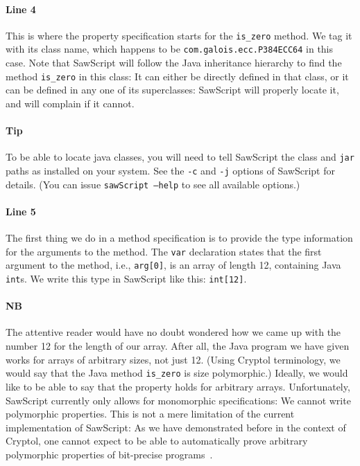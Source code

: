 \documentclass[12pt]{galois-whitepaper}
\newcommand{\sawScript}{{\sc SawScript}\xspace}
\begin{document}
\paragraph{Line 4} This is where the property specification starts for the {\tt is\_zero} method. We tag it with its class name,
which happens to be {\tt com.galois.ecc.P384ECC64} in this case. Note that \sawScript will follow the Java inheritance hierarchy
to find the method {\tt is\_zero} in this class: It can either be directly defined in that class, or it can be defined in any one
of its superclasses: \sawScript will properly locate it, and will complain if it cannot.

\paragraph{Tip} To be able to locate java classes, you will need to tell \sawScript the class and {\tt jar} paths as installed
on your system. See the {\tt -c} and {\tt -j} options of \sawScript for details. (You can issue {\tt sawScript --help} to see
all available options.)

\paragraph{Line 5} The first thing we do in a method specification is to provide the type information for the arguments to the method.
The {\tt var} declaration states that the first argument to the method, i.e., {\tt arg[0]}, is an array of length 12, containing
Java {\tt int}s. We write this type in \sawScript like this: {\tt int[12]}.

\paragraph{NB} The attentive reader would have no doubt wondered how we came up with the number 12 for the length of our array. After
all, the Java program we have given works for arrays of arbitrary sizes, not just 12. (Using Cryptol terminology, we would say that
the Java method {\tt is\_zero} is size polymorphic.) Ideally, we would like to be able to say that the property holds for arbitrary
arrays. Unfortunately, \sawScript currently only allows for monomorphic specifications: We cannot write polymorphic properties. This
is not a mere limitation of the current implementation of \sawScript: As we have demonstrated before in the context of Cryptol, one cannot
expect to be able to automatically prove arbitrary polymorphic properties of bit-precise programs~\cite{erkok-matthews-cryptolEqChecking-09}.
\end{document}
